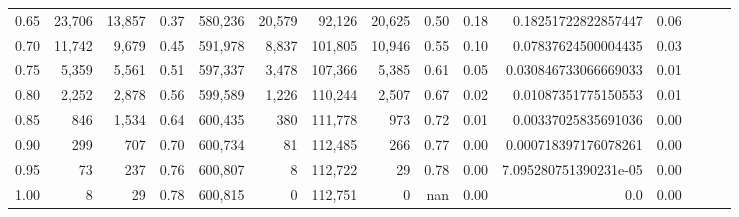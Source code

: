 \begin{tabular}{rrrrrrrrrrrrrrr}
0.65 &   23,706 &  13,857 &  0.37 &  580,236 &   20,579 &   92,126 &   20,625 &  0.50 &  0.18 &    0.18251722822857447 &      0.06 \\
0.70 &   11,742 &   9,679 &  0.45 &  591,978 &    8,837 &  101,805 &   10,946 &  0.55 &  0.10 &    0.07837624500004435 &      0.03 \\
0.75 &    5,359 &   5,561 &  0.51 &  597,337 &    3,478 &  107,366 &    5,385 &  0.61 &  0.05 &   0.030846733066669033 &      0.01 \\
0.80 &    2,252 &   2,878 &  0.56 &  599,589 &    1,226 &  110,244 &    2,507 &  0.67 &  0.02 &    0.01087351775150553 &      0.01 \\
0.85 &      846 &   1,534 &  0.64 &  600,435 &      380 &  111,778 &      973 &  0.72 &  0.01 &    0.00337025835691036 &      0.00 \\
0.90 &      299 &     707 &  0.70 &  600,734 &       81 &  112,485 &      266 &  0.77 &  0.00 &   0.000718397176078261 &      0.00 \\
0.95 &       73 &     237 &  0.76 &  600,807 &        8 &  112,722 &       29 &  0.78 &  0.00 &  7.095280751390231e-05 &      0.00 \\
1.00 &        8 &      29 &  0.78 &  600,815 &        0 &  112,751 &        0 &   nan &  0.00 &                    0.0 &      0.00 \\
\bottomrule
\end{tabular}
